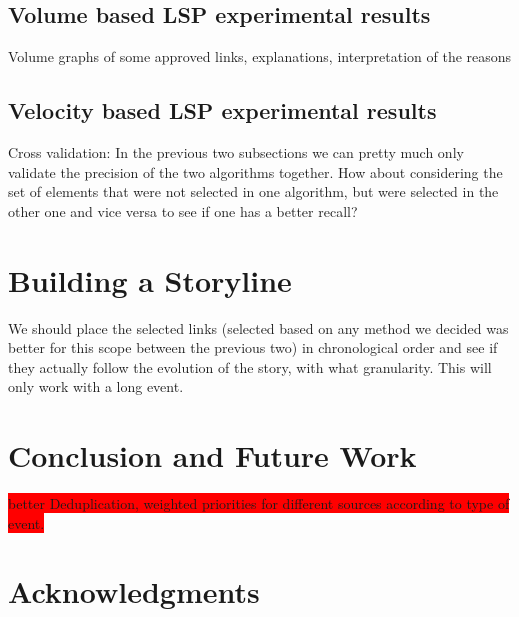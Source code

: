 \documentclass{sig-alternate}
\newcommand{\todo}[1]{\colorbox{red}{#1}}
\begin{document}
\subsection{Volume based LSP experimental results}
\label{sec:volumeResults}

Volume graphs of some approved links, explanations, interpretation of the reasons

\subsection{Velocity based LSP experimental results}
\label{sec:velocityResults}

Cross validation: In the previous two subsections we can pretty much only validate the precision of the two algorithms together. How about considering the set of elements that were not selected in one algorithm, but were selected in the other one and vice versa to see if one has a better recall?


\section{Building a Storyline}
\label{sec:storyline}
We should place the selected links (selected based on any method we decided was better for this scope between the previous two) in chronological order and see if they actually follow the evolution of the story, with what granularity. This will only work with a long event.



\section{Conclusion and Future Work}
\label{sec:conclusions}
\todo{better Deduplication, weighted priorities for different sources according to type of event.}

\section{Acknowledgments}
\label{sec:ack}

\nocite{*}


\balancecolumns
\end{document}
